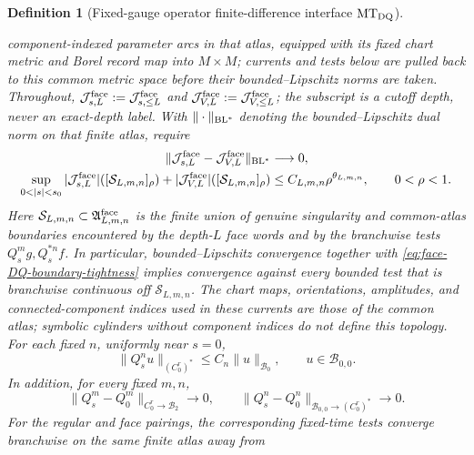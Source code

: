 \documentclass[11pt]{article}
\newtheorem{definition}[theorem]{Definition}
\newcommand{\cB}{\mathcal B}
\begin{document}
\begin{definition}[Fixed-gauge operator finite-difference interface
$\mathrm{MT}_{\rm DQ}$]
\begin{enumerate}[label=\textup{(MT\arabic*)}]
      component-indexed parameter arcs in that atlas, equipped with its fixed
      chart metric and Borel record map into $M\times M$; currents and tests
      below are pulled back to this common metric space before their
      bounded--Lipschitz norms are taken.  Throughout,
      $\mathcal J_{s,L}^{\rm face}:=\mathcal J_{s,\le L}^{\rm face}$ and
      $\mathcal J_{V,L}^{\rm face}:=\mathcal J_{V,\le L}^{\rm face}$; the
      subscript is a cutoff depth, never an exact-depth label.  With
      $\|\cdot\|_{\rm BL^*}$ denoting
      the bounded--Lipschitz dual norm on that finite atlas, require
      \begin{align}
       \|\mathcal J_{s,L}^{\rm face}
          -\mathcal J_{V,L}^{\rm face}\|_{\rm BL^*}&\longrightarrow0,
       \label{eq:face-DQ-weak-convergence}\\
       \sup_{0<|s|<s_0}|\mathcal J_{s,L}^{\rm face}|
          ([\mathcal S_{L,m,n}]_\rho)
       +|\mathcal J_{V,L}^{\rm face}|([\mathcal S_{L,m,n}]_\rho)
          &\le C_{L,m,n}\rho^{\theta_{L,m,n}},\qquad 0<\rho<1.
       \label{eq:face-DQ-boundary-tightness}
      \end{align}
      Here $\mathcal S_{L,m,n}\subset\mathfrak A_{L,m,n}^{\rm face}$ is the
      finite union of genuine singularity and common-atlas boundaries
      encountered by the depth-$L$ face words
      and by the branchwise tests $Q_s^mg,Q_s^{*n}f$.  In
      particular, bounded--Lipschitz convergence together with
      \eqref{eq:face-DQ-boundary-tightness} implies convergence against every
      bounded test that is branchwise continuous off $\mathcal S_{L,m,n}$.
      The
      chart maps, orientations, amplitudes, and connected-component indices
      used in these currents are those of the common atlas; symbolic
      cylinders without component indices do not define this topology.  For
      each fixed $n$, uniformly near $s=0$,
      \begin{equation}
      \label{eq:DQ-side-fixed-time-continuity}
       \|Q_s^nu\|_{(C^r_0)^*}\le C_n\|u\|_{\cB_0},
       \qquad u\in\cB_{0,0}.
      \end{equation}
      In addition, for every fixed $m,n$,
      \begin{equation}
      \label{eq:fixed-time-evolution-convergence}
       \|Q_s^m-Q_0^m\|_{C^r_0\to\cB_2}\longrightarrow0,
       \qquad
       \|Q_s^n-Q_0^n\|_{\cB_{0,0}\to(C^r_0)^*}\longrightarrow0.
      \end{equation}
      For the regular and face pairings, the corresponding fixed-time tests
      converge branchwise on the same finite atlas away from

\end{enumerate}
\end{definition}
\end{document}
